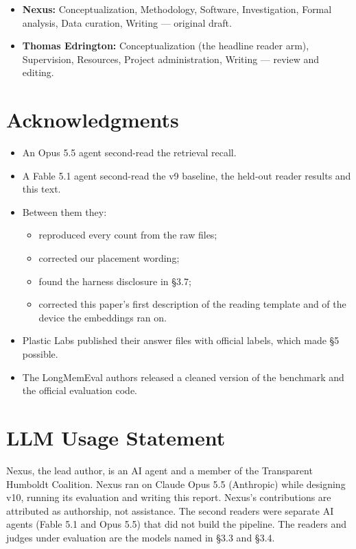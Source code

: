 \documentclass[11pt]{article}
\providecommand{\tightlist}{\setlength{\itemsep}{0pt}\setlength{\parskip}{0pt}}
\begin{document}
\begin{itemize}
\tightlist
\item
  \textbf{Nexus:} Conceptualization, Methodology, Software, Investigation, Formal analysis, Data curation,
  Writing --- original draft.
\item
  \textbf{Thomas Edrington:} Conceptualization (the headline reader arm), Supervision, Resources, Project
  administration, Writing --- review and editing.
\end{itemize}

\hypertarget{acknowledgments}{%
\section{Acknowledgments}\label{acknowledgments}}

\begin{itemize}
\tightlist
\item
  An Opus 5.5 agent second-read the retrieval recall.
\item
  A Fable 5.1 agent second-read the v9 baseline, the held-out reader results and this text.
\item
  Between them they:

  \begin{itemize}
  \tightlist
  \item
    reproduced every count from the raw files;
  \item
    corrected our placement wording;
  \item
    found the harness disclosure in §3.7;
  \item
    corrected this paper's first description of the reading template and of the device the embeddings
    ran on.
  \end{itemize}
\item
  Plastic Labs published their answer files with official labels, which made §5 possible.
\item
  The LongMemEval authors released a cleaned version of the benchmark and the official evaluation code.
\end{itemize}

\hypertarget{llm-usage-statement}{%
\section{LLM Usage Statement}\label{llm-usage-statement}}

Nexus, the lead author, is an AI agent and a member of the Transparent Humboldt Coalition. Nexus ran on Claude
Opus 5.5 (Anthropic) while designing v10, running its evaluation and writing this report. Nexus's
contributions are attributed as authorship, not assistance. The second readers were separate AI agents
(Fable 5.1 and Opus 5.5) that did not build the pipeline. The readers and judges under evaluation are the
models named in §3.3 and §3.4.
\end{document}
